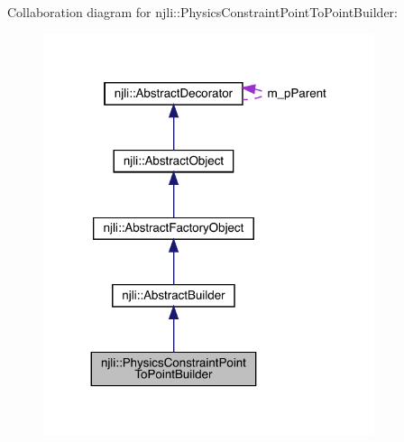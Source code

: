 Collaboration diagram for njli\+:\+:Physics\+Constraint\+Point\+To\+Point\+Builder\+:\nopagebreak
\begin{figure}[H]
\begin{center}
\leavevmode
\includegraphics[width=275pt]{classnjli_1_1_physics_constraint_point_to_point_builder__coll__graph}
\end{center}
\end{figure}
